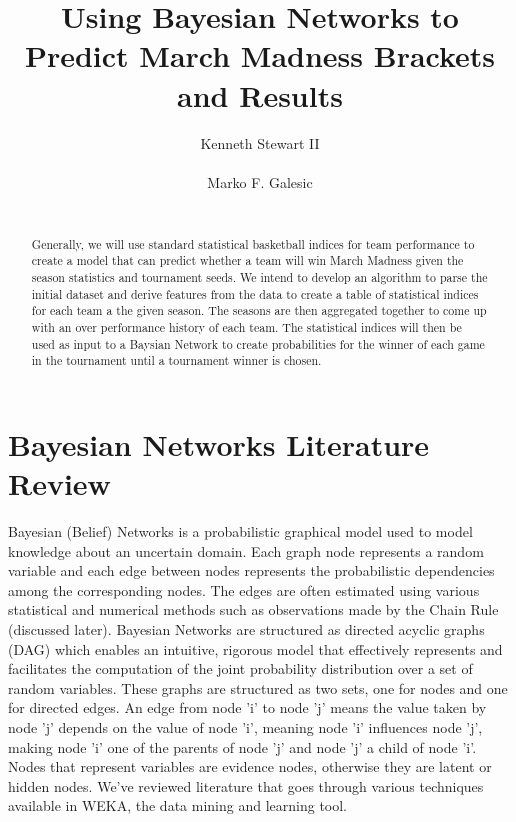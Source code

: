\documentclass{acm_proc_article-sp}
\begin{document}
\title{Using Bayesian Networks to Predict March Madness Brackets and Results}
\author{
\alignauthor
Kenneth Stewart II\\
       \\
\alignauthor
Marko F. Galesic\\
       \\
}
\maketitle
\begin{abstract}
Generally, we will use standard statistical basketball indices for team performance to create a 
model that can predict whether a team will win March Madness given the season statistics and 
tournament seeds. We intend to develop an algorithm to parse the initial dataset and derive features 
from the data to create a table of statistical indices for each team a the given season. The seasons 
are then aggregated together to come up with an over performance history of each team. The 
statistical indices will then be used as input to a Baysian Network to create probabilities for the
winner of each game in the tournament until a tournament winner is chosen.
\end{abstract}
\section{Bayesian Networks Literature Review}
Bayesian (Belief) Networks is a probabilistic graphical model used to model knowledge about an 
uncertain domain. Each graph node represents a random variable and each edge between nodes 
represents the probabilistic dependencies among the corresponding nodes\cite{heckerman}.
The edges are often estimated using various statistical and numerical methods such as observations 
made by the Chain Rule (discussed later).\cite{wagner, tan} 
Bayesian Networks are structured as directed acyclic graphs (DAG) which enables an intuitive, rigorous model that effectively represents and facilitates the computation of the joint probability distribution over a set of random variables\cite{heckerman}. These graphs are structured as two sets, one for nodes and one for directed edges. An edge from node 'i' to node 'j' means the value taken by node 'j' depends on the value of node 'i', meaning node 'i' influences node 'j', making node 'i' one of the parents of node 'j' and node 'j' a child of node 'i'\cite{heckerman}. Nodes that represent variables are evidence nodes, otherwise they are latent or hidden nodes. We've reviewed literature that goes through various techniques available in WEKA, the data mining and learning tool.\cite{weka}
\newpage
\end{document}
